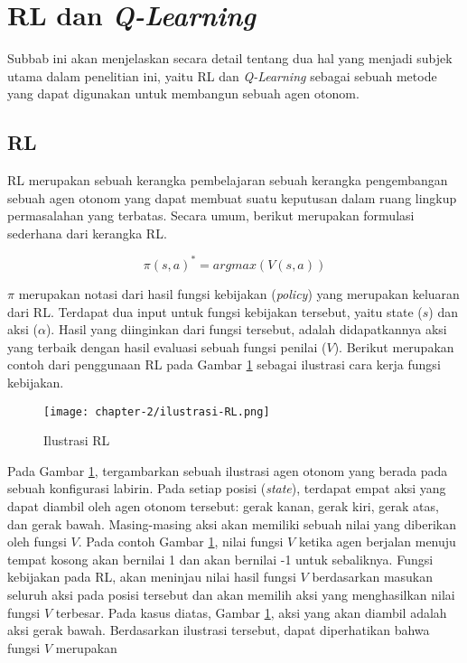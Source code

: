 \section{\acl{RL} dan \textit{Q-Learning}}

Subbab ini akan menjelaskan secara detail tentang dua hal yang menjadi subjek utama dalam penelitian ini, yaitu \acl{RL} dan \textit{Q-Learning} sebagai sebuah metode yang dapat digunakan untuk membangun sebuah agen otonom.

\subsection{\acl{RL}}
\label{sub:sub-rl}

\acf{RL} merupakan sebuah kerangka pembelajaran sebuah kerangka pengembangan sebuah agen otonom yang dapat membuat suatu keputusan dalam ruang lingkup permasalahan yang terbatas. Secara umum, berikut merupakan formulasi sederhana dari kerangka \ac{RL}.

\begin{equation}
	\pi(s,a)^* = argmax(V(s,a))
\end{equation}

\(\pi\) merupakan notasi dari hasil fungsi kebijakan (\textit{policy}) yang merupakan keluaran dari \ac{RL}. Terdapat dua input untuk fungsi kebijakan tersebut, yaitu state (\(s\)) dan aksi (\(\alpha\)). Hasil yang diinginkan dari fungsi tersebut, adalah didapatkannya aksi yang terbaik dengan hasil evaluasi sebuah fungsi penilai (\(V\)). Berikut merupakan contoh dari penggunaan \ac{RL} pada Gambar \ref{fig:ilustrasi-RL} sebagai ilustrasi cara kerja fungsi kebijakan.

\begin{figure}[h]
	\centering
	\texttt{[image: chapter-2/ilustrasi-RL.png]}
	\caption{Ilustrasi \ac{RL}}
	\label{fig:ilustrasi-RL}
\end{figure}


Pada Gambar \ref{fig:ilustrasi-RL}, tergambarkan sebuah ilustrasi agen otonom yang berada pada sebuah konfigurasi labirin. Pada setiap posisi (\textit{state}), terdapat empat aksi yang dapat diambil oleh agen otonom tersebut: gerak kanan, gerak kiri, gerak atas, dan gerak bawah. Masing-masing aksi akan memiliki sebuah nilai yang diberikan oleh fungsi \(V\). Pada contoh Gambar \ref{fig:ilustrasi-RL}, nilai fungsi \(V\) ketika agen berjalan menuju tempat kosong akan bernilai 1 dan akan bernilai -1 untuk sebaliknya. Fungsi kebijakan pada \ac{RL}, akan meninjau nilai hasil fungsi \(V\) berdasarkan masukan seluruh aksi pada posisi tersebut dan akan memilih aksi yang menghasilkan nilai fungsi \(V\) terbesar. Pada kasus diatas, Gambar \ref{fig:ilustrasi-RL}, aksi yang akan diambil adalah aksi gerak bawah. Berdasarkan ilustrasi tersebut, dapat diperhatikan bahwa fungsi \(V\) merupakan

